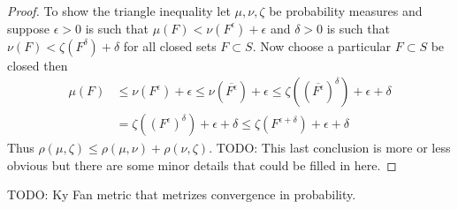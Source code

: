 \begin{proof}
To show the triangle inequality let $\mu, \nu, \zeta$ be probability
measures and suppose $\epsilon > 0$ is such that $\mu(F) <
\nu(F^\epsilon) + \epsilon$ and $\delta > 0$ is such that $\nu(F) <
\zeta(F^\delta) + \delta$ for all closed sets $F \subset S$.  Now
choose a particular $F \subset S$ be closed then
\begin{align*}
\mu(F) 
&\leq \nu(F^\epsilon) + \epsilon 
\leq \nu(\overline{F^\epsilon})+ \epsilon 
\leq \zeta((\overline{F^\epsilon})^\delta)+ \epsilon + \delta \\
&=\zeta((F^\epsilon)^\delta)+ \epsilon + \delta 
\leq \zeta(F^{\epsilon+\delta})+ \epsilon + \delta
\end{align*}
Thus $\rho(\mu, \zeta) \leq \rho(\mu, \nu) + \rho(\nu, \zeta)$.  TODO:
This last conclusion is more or less obvious but there are some minor details that
could be filled in here.
\end{proof}

TODO: Ky Fan metric that metrizes convergence in probability.